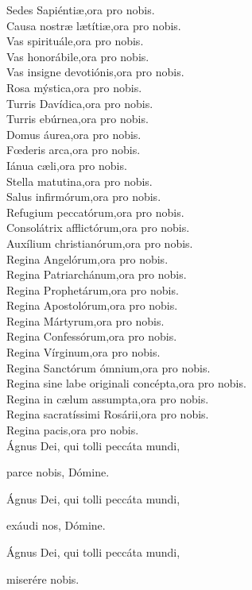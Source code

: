 Sedes Sapiénti{\ae},\hfill ora pro nobis.\\
Causa nostr{\ae} l{\ae}títi{\ae},\hfill ora pro nobis.\\
Vas spirituále,\hfill ora pro nobis.\\
Vas honorábile,\hfill ora pro nobis.\\
Vas insigne devotiónis,\hfill ora pro nobis.\\
Rosa mýstica,\hfill ora pro nobis.\\
Turris Davídica,\hfill ora pro nobis.\\
Turris ebúrnea,\hfill ora pro nobis.\\
Domus áurea,\hfill ora pro nobis.\\
F{\oe}deris arca,\hfill ora pro nobis.\\
Iánua c{\ae}li,\hfill ora pro nobis.\\
Stella matutina,\hfill ora pro nobis.\\
Salus infirmórum,\hfill ora pro nobis.\\
Refugium peccatórum,\hfill ora pro nobis.\\
Consolátrix afflictórum,\hfill ora pro nobis.\\
Auxílium christianórum,\hfill ora pro nobis.\\
Regina Angelórum,\hfill ora pro nobis.\\
Regina Patriarchánum,\hfill ora pro nobis.\\
Regina Prophetárum,\hfill ora pro nobis.\\
Regina Apostolórum,\hfill ora pro nobis.\\
Regina Mártyrum,\hfill ora pro nobis.\\
Regina Confessórum,\hfill ora pro nobis.\\
Regina Vírginum,\hfill ora pro nobis.\\
Regina Sanctórum ómnium,\hfill ora pro nobis.\\
Regina sine labe originali concépta,\hfill ora pro nobis.\\
Regina in c{\ae}lum assumpta,\hfill ora pro nobis.\\
Regina sacratíssimi Rosárii,\hfill ora pro nobis.\\
Regina pacis,\hfill ora pro nobis.\\
Ágnus Dei, qui tolli peccáta mundi,

\hfill parce nobis, Dómine.

\noindent Ágnus Dei, qui tolli peccáta mundi, 

\hfill exáudi nos, Dómine.

\noindent Ágnus Dei, qui tolli peccáta mundi, 

\hfill miserére nobis.
